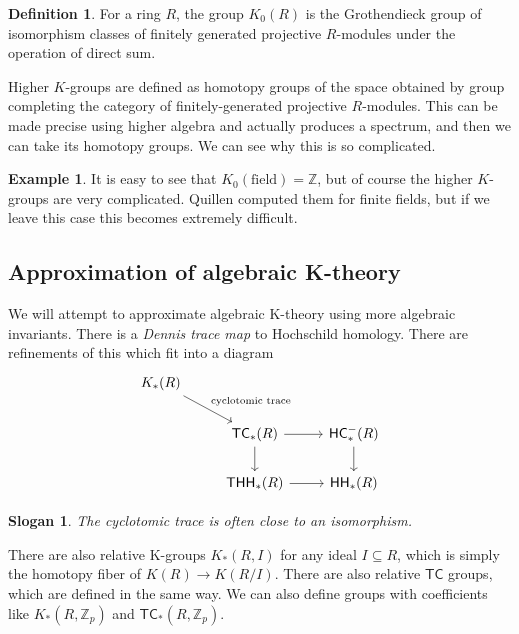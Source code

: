 \documentclass[10pt, oneside]{memoir}
\theoremstyle{definition}
\theoremstyle{remark}
\theoremstyle{plain}
\newtheorem*{slog*}{Slogan}
\theoremstyle{definition}
\newtheorem*{defn*}{Definition}
\newtheorem*{exm*}{Example}
\theoremstyle{remark}
\newcommand{\Z}{\mathbb{Z}}
\newcommand{\ms}[1]{\mathsf{#1}}
\newcommand{\1}{\mathbf{1}}
\newcommand{\2}{\mathbf{2}}
\newcommand{\3}{\mathbf{3}}
\newcommand{\HC}{\ms{HC}}
\newcommand{\THH}{\ms{THH}}
\newcommand{\TC}{\ms{TC}}
\newcommand{\HH}{\ms{HH}}
\begin{document}
\begin{defn*}
    For a ring $R$, the group $K_0(R)$ is the Grothendieck group of isomorphism classes of finitely generated projective $R$-modules under the operation of direct sum.
\end{defn*}

Higher $K$-groups are defined as homotopy groups of the space obtained by group completing the category of finitely-generated projective $R$-modules. This can be made precise using higher algebra and actually produces a spectrum, and then we can take its homotopy groups. We can see why this is so complicated. 

\begin{exm*}
    It is easy to see that $K_0(\text{field}) = \Z$, but of course the higher $K$-groups are very complicated. Quillen computed them for finite fields, but if we leave this case this becomes extremely difficult. 
\end{exm*}

\subsection*{Approximation of algebraic K-theory}%
\label{sub:Approximation of algebraic K-theory}

We will attempt to approximate algebraic K-theory using more algebraic invariants. There is a \textit{Dennis trace map} to Hochschild homology. There are refinements of this which fit into a diagram
\begin{equation*}
\begin{tikzcd}
    K_*(R) \ar{dr}{\text{cyclotomic trace}} \\
    & \TC_*(R) \ar{r} \ar{d} & \HC_*^-(R) \ar{d} \\
    & \THH_*(R) \ar{r} & \HH_*(R)
\end{tikzcd}
\end{equation*}

\begin{slog*}
    The cyclotomic trace is often close to an isomorphism.
\end{slog*}

There are also relative K-groups $K_*(R, I)$ for any ideal $I \subseteq R$, which is simply the homotopy fiber of $K(R) \to K(R/I)$. There are also relative $\TC$ groups, which are defined in the same way. We can also define groups with coefficients like $K_*(R, \Z_p)$ and $\TC_*(R, \Z_p)$. 
\end{document}
